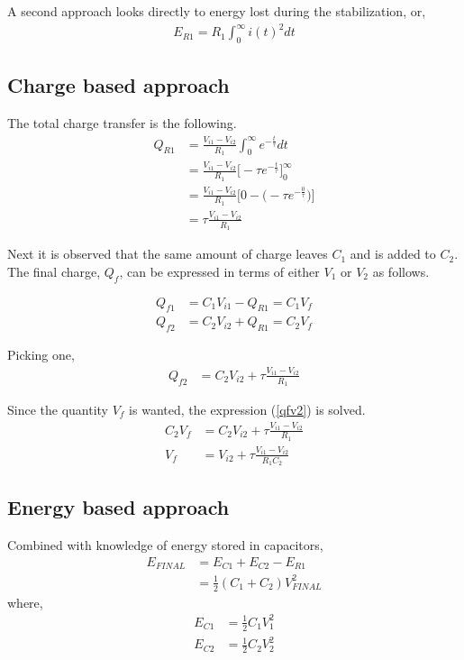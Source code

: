 \documentclass[12pt,letterpaper]{report}
\begin{document}
	A second approach looks directly to energy lost during the stabilization, or,
	\begin{align}
		E_{R1} = R_1 \int_{0}^{\infty} i(t)^2 dt
	\end{align}

	\subsection{Charge based approach}
	The total charge transfer is the following.
	\begin{align}
	Q_{R1} &= \frac{V_{i1} - V_{i2}}{R_1}  \int_{0}^{\infty}  e^{-\frac{t}{\tau}} dt \nonumber \\
	&= \frac{V_{i1} - V_{i2}}{R_1}   \bigg[ -\tau e^{-\frac{t}{\tau}} \bigg ]_{0}^{\infty} \nonumber \\
	&= \frac{V_{i1} - V_{i2}}{R_1}  \bigg[ 0 - \big ( -\tau e^{-\frac{0}{\tau}} \big) \bigg ] \nonumber \\
	&= \tau \frac{V_{i1} - V_{i2}}{R_1}
	\end{align}	

	Next it is observed that the same amount of charge leaves $C_1$ and is added to $C_2$.  The final charge, $Q_f$, can be expressed in terms of either $V_1$ or $V_2$ as follows.
	
	\begin{align}
	Q_{f1} &= C_1 V_{i1} - Q_{R1} = C_1 V_f \nonumber \\
	Q_{f2} &= C_2 V_{i2} + Q_{R1} = C_2 V_f
	\end{align}

	Picking one,
	\begin{align}
		Q_{f2} &= C_2 V_{i2} + \tau \frac{V_{i1} - V_{i2}}{R_1} \label{qfv2}
	\end{align}

	Since the quantity $V_f$ is wanted, the expression (\ref{qfv2}) is solved.
	\begin{align}
		C_2 V_f &= C_2 V_{i2} + \tau \frac{V_{i1} - V_{i2}}{R_1}  \nonumber \\
		V_f &= V_{i2} + \tau \frac{V_{i1} - V_{i2}}{R_1 C_2} \label{vfinal_cg_based}		
	\end{align}

	\subsection{Energy based approach}
	Combined with knowledge of energy stored in capacitors,
	\begin{align}
		E_{FINAL} &= E_{C1} + E_{C2} - E_{R1} \nonumber \\
		&= \frac{1}{2} (C_1+C_2)V_{FINAL}^2 \label{efinal}
	\end{align}
	where,
	\begin{align}
		E_{C1} &= \frac{1}{2}C_1V_1^2 \nonumber\\
		E_{C2} &= \frac{1}{2}C_2V_2^2
	\end{align}
\end{document}
